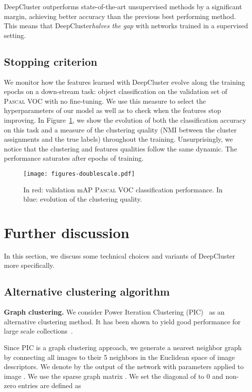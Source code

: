 \documentclass[runningheads]{llncs}
\def\OURS{DeepCluster\xspace}
\begin{document}
\OURS outperforms state-of-the-art unsupervised methods by a significant margin, achieving  better accuracy than the previous best performing method.
This means that \OURS \emph{halves the gap} with networks trained in a supervised setting.

\subsection{Stopping criterion}
We monitor how the features learned with \OURS evolve along the training epochs on a down-stream task: object classification on the validation set of \textsc{Pascal} VOC with no fine-tuning.
We use this measure to select the hyperparameters of our model as well as to check when the features stop improving.
In Figure~\ref{convergence}, we show the evolution of both the classification accuracy on this task and a measure of the clustering quality (NMI between the cluster assignments and the true labels) throughout the training.
Unsurprisingly, we notice that the clustering and features qualities follow the same dynamic.
The performance saturates after  epochs of training.


\begin{figure}[!h]
\centering
\texttt{[image: figures-doublescale.pdf]}
\caption{In red: validation mAP \textsc{Pascal} VOC classification performance.
         In blue: evolution of the clustering quality.}
\label{convergence}
\end{figure}


\section{Further discussion}

In this section, we discuss some technical choices and variants of \OURS more specifically.

\subsection{Alternative clustering algorithm}

\noindent\textbf{Graph clustering.}
We consider Power Iteration Clustering (PIC)~\cite{lin2010power} as an alternative clustering method.
It has been shown to yield good performance for large scale collections~\cite{douze2017evaluation}.

Since PIC is a graph clustering approach, we generate a nearest neighbor graph by connecting all images to their 5 neighbors in the Euclidean space of image descriptors. 
We denote by  the output of the network with parameters  applied to image . 
We use the sparse graph matrix . 
We set the diagonal of  to 0 and non-zero entries are defined as 
\end{document}
